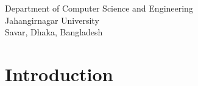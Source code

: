 \documentclass[a4paper,12pt]{article}
\begin{document}
\begin{center}
\begin{table}[h!]
\begin{tabular}{|c|c|c|c|}
        \end{tabular}
    \end{table}

    \vspace{1cm}

    Department of Computer Science and Engineering\\
    Jahangirnagar University\\
    Savar, Dhaka, Bangladesh\\
\end{center}

\newpage

\tableofcontents

\newpage
\pagestyle{fancy}
\fancyhf{}
\fancyfoot[C]{\thepage} %
\section{Introduction}
\end{document}
